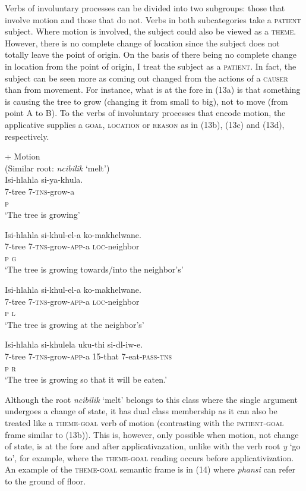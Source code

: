 \documentclass[output=paper]{langsci/langscibook}
\begin{document}
Verbs of involuntary processes can be divided into two subgroups: those that involve motion and those that do not. Verbs in both subcategories take a \textsc{patient} subject. Where motion is involved, the subject could also be viewed as a \textsc{theme}. However, there is no complete change of location since the subject does not totally leave the point of origin. On the basis of there being no complete change in location from the point of origin, I treat the subject as a \textsc{patient}. In fact, the subject can be seen more as coming out changed from the actions of a \textsc{causer} than from movement. For instance, what is at the fore in (13a) is that something is causing the tree to grow (changing it from small to big), not to move (from point A to B). To the verbs of involuntary processes that encode motion, the applicative supplies a \textsc{goal}, \textsc{location} or \textsc{reason} as in (13b), (13c) and (13d), respectively.

\ea
 {+ Motion}\\
 (Similar root: \textit{ncibilik} ‘melt’)\\
\ea
\gll Isi-hlahla si-ya-khula. \\
 7-tree 7-\textsc{tns}-grow-a \\
 \textsc{p}\\
\glt ‘The tree is growing’

\ex
\gll Isi-hlahla si-khul-el-a ko-makhelwane. \\
 7-tree 7-\textsc{tns}-grow-\textsc{app}-a \textsc{loc}-neighbor \\
 \textsc{p g}\\
\glt ‘The tree is growing towards/into the neighbor’s’

\ex
\gll Isi-hlahla si-khul-el-a ko-makhelwane. \\
 7-tree 7-\textsc{tns}-grow-\textsc{app}-a \textsc{loc}-neighbor \\
 \textsc{p l}\\
\glt ‘The tree is growing at the neighbor’s’ 

\ex
\gll Isi-hlahla si-khulela uku-thi si-dl-iw-e.\\
 7-tree 7-\textsc{tns}-grow-\textsc{app}-a 15-that 7-eat-\textsc{pass-tns}\\
 \textsc{p r}\\
\glt ‘The tree is growing so that it will be eaten.’ 
\z
\z

Although the root \textit{ncibilik} ‘melt’ belongs to this class where the single argument undergoes a change of state, it has dual class membership as it can also be treated like a \textsc{theme-goal} verb of motion (contrasting with the \textsc{patient-goal} frame similar to (13b)). This is, however, only possible when motion, not change of state, is at the fore and after applicativazation, unlike with the verb root \textit{y }‘go to’, for example, where the \textsc{theme-goal} reading occurs before applicativization. An example of the \textsc{theme-goal} semantic frame is in (14) where \textit{phansi} can refer to the ground of floor. 
\end{document}
